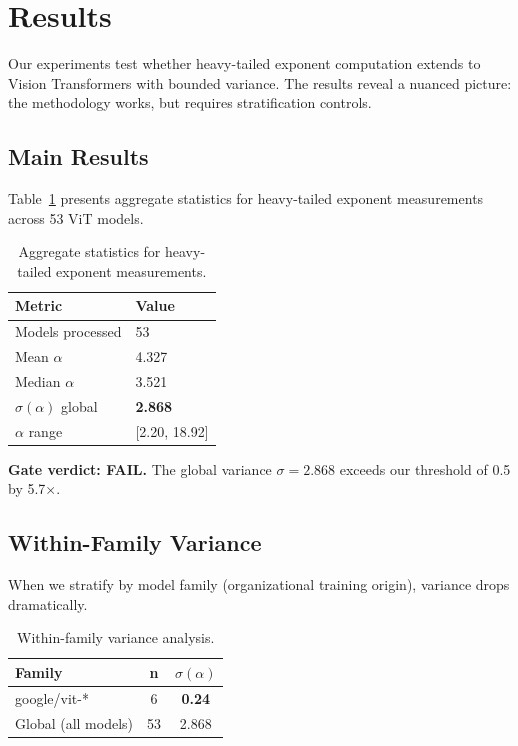 \section{Results}
\label{sec:results}

Our experiments test whether heavy-tailed exponent computation extends to Vision Transformers with bounded variance. The results reveal a nuanced picture: the methodology works, but requires stratification controls.

\subsection{Main Results}

Table~\ref{tab:main} presents aggregate statistics for heavy-tailed exponent measurements across 53 ViT models.

\begin{table}[h]
\centering
\begin{tabular}{ll}
\toprule
\textbf{Metric} & \textbf{Value} \\
\midrule
Models processed & 53 \\
Mean $\alpha$ & 4.327 \\
Median $\alpha$ & 3.521 \\
$\sigma(\alpha)$ global & \textbf{2.868} \\
$\alpha$ range & [2.20, 18.92] \\
\bottomrule
\end{tabular}
\caption{Aggregate statistics for heavy-tailed exponent measurements.}
\label{tab:main}
\end{table}

\textbf{Gate verdict: FAIL.} The global variance $\sigma = 2.868$ exceeds our threshold of 0.5 by 5.7$\times$.

\subsection{Within-Family Variance}

When we stratify by model family (organizational training origin), variance drops dramatically.

\begin{table}[h]
\centering
\begin{tabular}{lcc}
\toprule
\textbf{Family} & \textbf{n} & $\sigma(\alpha)$ \\
\midrule
google/vit-* & 6 & \textbf{0.24} \\
Global (all models) & 53 & 2.868 \\
\bottomrule
\end{tabular}
\caption{Within-family variance analysis.}
\label{tab:family}
\end{table}

